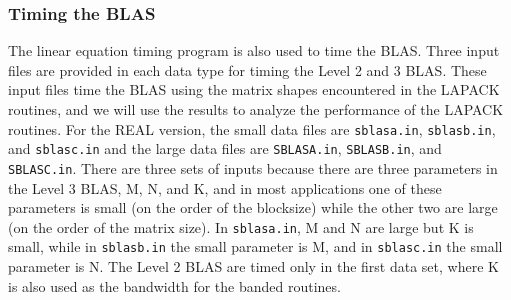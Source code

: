 \subsubsection{Timing the BLAS}

\dent
The linear equation timing program is also used to time the BLAS.
Three input files are provided in each data type for timing the Level
2 and 3 BLAS. 
These input files time the BLAS using the matrix shapes encountered
in the LAPACK routines, and we will use the results to analyze the
performance of the LAPACK routines. 
For the REAL version, the small data files are
{\tt sblasa.in}, {\tt sblasb.in}, and {\tt sblasc.in}
and the large data files are
{\tt SBLASA.in}, {\tt SBLASB.in}, and {\tt SBLASC.in}.
There are three sets of inputs because there are three
parameters in the Level 3 BLAS, M, N, and K, and
in most applications one of these parameters is small (on the order
of the blocksize) while the other two are large (on the order of the
matrix size).  
In {\tt sblasa.in}, M and N are large but K is
small, while in {\tt sblasb.in} the small parameter is M, and
in {\tt sblasc.in} the small parameter is N.  
The Level 2 BLAS are timed only in the first data set, where K
is also used as the bandwidth for the banded routines.

